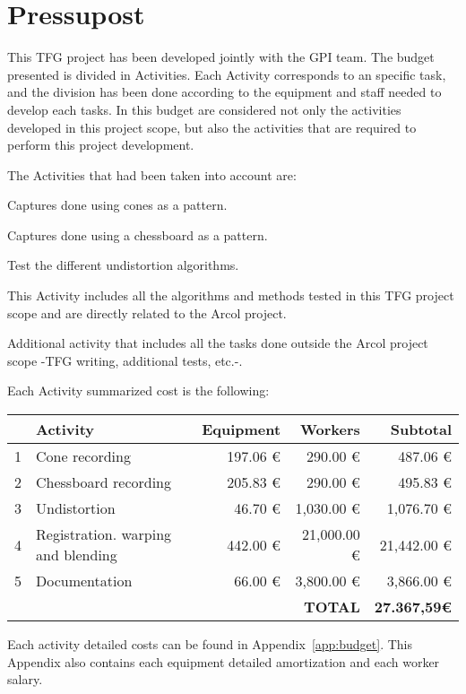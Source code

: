 \chapter{Pressupost}\label{chapter:pressupost}

This TFG project has been developed jointly with the GPI team. The budget presented is divided in Activities. Each Activity corresponds to an specific task, and the division has been done according to the equipment and staff needed to develop each tasks. In this budget are considered not only the activities developed in this project scope, but also the activities that are required to perform this project development. 

The Activities that had been taken into account are:
\begin{description}[font=\normalfont\textsl]
\item[Activity 1: Recording I.] Captures done using cones as a pattern.
\item[Activity 2: Recording II.] Captures done using a chessboard as a pattern.
\item[Activity 3: Undistortion.] Test the different undistortion algorithms.
\item[Activity 4: Registration, warping and blending.] This Activity includes all the algorithms and methods tested in this TFG project scope and are directly related to the Arcol project.
\item[Activity 5: Documentation.] Additional activity that includes all the tasks done outside the Arcol project scope -TFG writing, additional tests, etc.-.

\end{description}

Each Activity summarized cost is the following:

\begin{table}[H]
\begin{tabular}{l l r r r}
&Activity&Equipment&Workers&Subtotal\\
\hline\hline
1&Cone recording&197.06 \euro{}&290.00 \euro{}&487.06 \euro\\
2&Chessboard recording&205.83 \euro{}&290.00 \euro{}&495.83 \euro \\
3&Undistortion&46.70 \euro{}&1,030.00 \euro{}&1,076.70 \euro\\
4&Registration. warping and blending&442.00 \euro{}&21,000.00 \euro{}&21,442.00 \euro\\
5&Documentation&66.00 \euro{}&3,800.00 \euro{}&3,866.00 \euro\\[0.3cm]
& & &  \textbf{TOTAL} & \textbf{27.367,59\euro }
\end{tabular}
\end{table}

Each activity detailed costs can be found in Appendix~\ref{app:budget}. This Appendix also contains each equipment detailed amortization and each worker salary.


